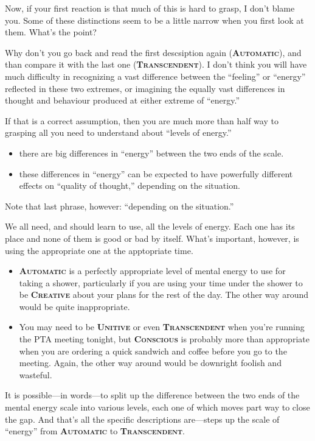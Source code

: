 \documentclass[a5paper]{article}
\begin{document}
Now, if your first reaction is that much of this is hard to grasp, I don't blame you.
Some of these distinctions seem to be a little narrow when you first look at them.
What's the point?

Why don't you go back and read the first descsiption again (\textbf{\scshape Automatic}), and than compare it with the last one (\textbf{\scshape Transcendent}).
I don't think you will have much difficulty in recognizing a vast difference between the ``feeling'' or ``energy'' reflected in these two extremes, or imagining the equally vast differences in thought and behaviour produced at either extreme of ``energy.''

If that is a correct assumption, then you are much more than half way to grasping all you need to understand about ``levels of energy.''
\begin{itemize}
  \item there are big differences in ``energy'' between the two ends of the scale.
  \item these differences in ``energy'' can be expected to have powerfully different effects on ``quality of thought,'' depending on the situation.
\end{itemize}
Note that last phrase, however: ``depending on the situation.''

We all need, and should learn to use, all the levels of energy.
Each one has its place and none of them is good or bad by itself.
What's important, however, is using the appropriate one at the apptopriate time.
\begin{itemize}
  \item \textbf{\scshape Automatic} is a perfectly appropriate level of mental energy to use for taking a shower, particularly if you are using your time under the shower to be \textbf{\scshape Creative} about your plans for the rest of the day.
    The other way around would be quite inappropriate.
  \item You may need to be \textbf{\scshape Unitive} or even \textbf{\scshape Transcendent} when you're running the PTA meeting tonight, but \textbf{\scshape Conscious} is probably more than appropriate when you are ordering a quick sandwich and coffee before you go to the meeting.
    Again, the other way around would be downright foolish and wasteful.
\end{itemize}
It is possible---in words---to split up the difference between the two ends of the mental energy scale into various levels, each one of which moves part way to close the gap.
And that's all the specific descriptions are---steps up the scale of ``energy'' from \textbf{\scshape Automatic} to \textbf{\scshape Transcendent}.
\end{document}
